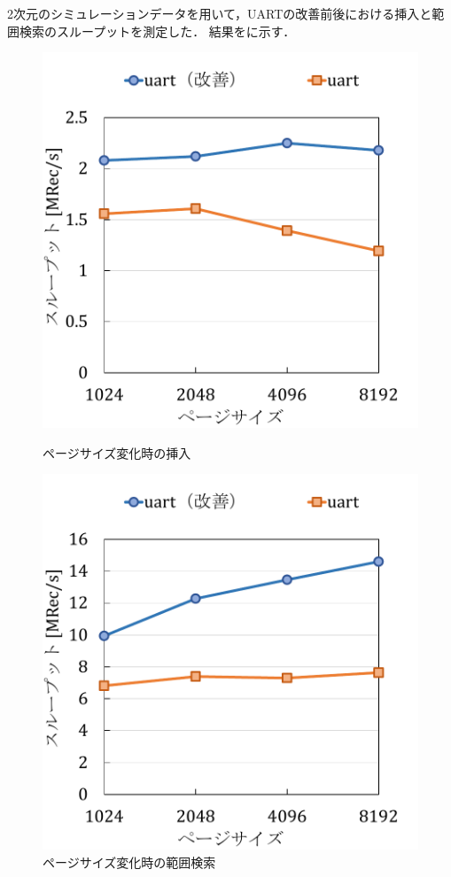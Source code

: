 2次元のシミュレーションデータを用いて，UARTの改善前後における挿入と範囲検索のスループットを測定した．
結果を\Fig{\ref{graph:ps-in}}\Fig{\ref{graph:ps-sc}}に示す．
\begin{figure}[tb]
  \begin{minipage}[c]{0.495\textwidth}
    \centering
    \includegraphics[scale=0.5]{./figures/graph-pagesize-insert.pdf}
    \caption{ページサイズ変化時の挿入}
    \label{graph:ps-in}
  \end{minipage}
  \begin{minipage}[c]{0.495\textwidth}
    \centering
    \includegraphics[scale=0.5]{./figures/graph-pagesize-scan.pdf}
    \caption{ページサイズ変化時の範囲検索}
    \label{graph:ps-sc}
  \end{minipage}
\end{figure}
